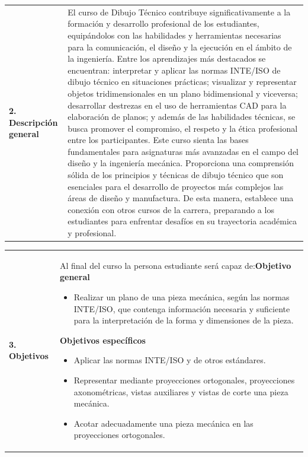 \documentclass[letterpaper]{article}%
\begin{document}
\begin{tabularx}{\textwidth}{p{3cm}p{13cm}}%
\par\fontsize{12}{14}\selectfont \textbf{\textcolor{parte}{2. Descripción general}}&El curso de Dibujo Técnico contribuye significativamente a la formación y desarrollo profesional de los estudiantes, equipándolos con las habilidades y herramientas necesarias para la comunicación, el diseño y la ejecución en el ámbito de la ingeniería.
\newline%
\newline%
Entre los aprendizajes más destacados se encuentran:  interpretar y aplicar las normas INTE/ISO de dibujo técnico en situaciones prácticas; visualizar y representar objetos tridimensionales en un plano bidimensional y viceversa; desarrollar destrezas en el uso de herramientas CAD para la elaboración de planos; y además de las habilidades técnicas, se busca promover el compromiso, el respeto y la ética profesional entre los participantes.​
\newline%
\newline%
Este curso sienta las bases fundamentales para asignaturas más avanzadas en el campo del diseño y la ingeniería mecánica. Proporciona una comprensión sólida de los principios y técnicas de dibujo técnico que son esenciales para el desarrollo de proyectos más complejos las áreas de diseño y manufactura. De esta manera, establece una conexión con otros cursos de la carrera, preparando a los estudiantes para enfrentar desafíos en su trayectoria académica y profesional.​\\%
\end{tabularx}%
\vspace*{4mm}%
\newline%
\begin{tabularx}{\textwidth}{p{3cm}p{13cm}}%
\par\fontsize{12}{14}\selectfont \textbf{\textcolor{parte}{3. Objetivos}}&Al final del curso la persona estudiante será capaz de:\newline\newline \textbf{Objetivo general}\begin{itemize}\item Realizar un plano de una pieza mecánica, según las normas INTE/ISO, que contenga información necesaria y suficiente para la interpretación de la forma y dimensiones de la pieza.\end{itemize} \vspace{2mm}\textbf{Objetivos específicos}\begin{itemize}\item Aplicar las normas INTE/ISO y de otros estándares.\item Representar mediante proyecciones ortogonales, proyecciones axonométricas, vistas auxiliares y vistas de corte una pieza mecánica.\item Acotar adecuadamente una pieza mecánica en las proyecciones ortogonales.\end{itemize}\\%
\end{tabularx}%
\end{document}
